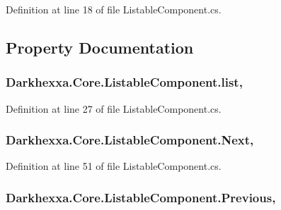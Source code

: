 Definition at line 18 of file Listable\-Component.\-cs.



\subsection{Property Documentation}
\hypertarget{class_darkhexxa_1_1_core_1_1_listable_component_a04c51fde5d01ceae927e191e1420c27e}{
\subsubsection[{list}]{ Darkhexxa.\-Core.\-Listable\-Component.\-list\hspace{0.3cm}{\ttfamily [get]}, {\ttfamily [set]}}}\label{class_darkhexxa_1_1_core_1_1_listable_component_a04c51fde5d01ceae927e191e1420c27e}


Definition at line 27 of file Listable\-Component.\-cs.

\hypertarget{class_darkhexxa_1_1_core_1_1_listable_component_acd3a93b2ac0c5536bad8a3fd74cc1e5a}{
\subsubsection[{Next}]{ Darkhexxa.\-Core.\-Listable\-Component.\-Next\hspace{0.3cm}{\ttfamily [get]}, {\ttfamily [set]}}}\label{class_darkhexxa_1_1_core_1_1_listable_component_acd3a93b2ac0c5536bad8a3fd74cc1e5a}


Definition at line 51 of file Listable\-Component.\-cs.

\hypertarget{class_darkhexxa_1_1_core_1_1_listable_component_afe73beef049d8199b6c205e27653ae29}{
\subsubsection[{Previous}]{ Darkhexxa.\-Core.\-Listable\-Component.\-Previous\hspace{0.3cm}{\ttfamily [get]}, {\ttfamily [set]}}}\label{class_darkhexxa_1_1_core_1_1_listable_component_afe73beef049d8199b6c205e27653ae29}


